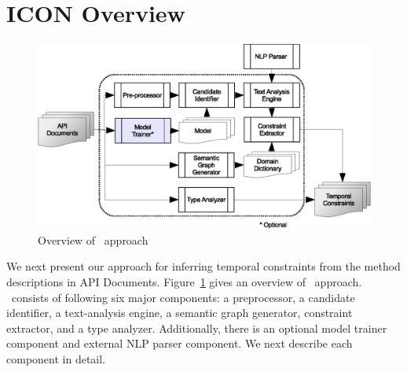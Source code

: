 \section{ICON Overview}
\label{sec:approach}

\begin{figure}
	\centering
		\includegraphics[scale=0.45]{approach.eps}
	\caption{Overview of \tool\ approach}
	\label{fig:approachOverview}
\end{figure}

We next present our approach for inferring temporal constraints
from the method descriptions in API Documents.
Figure~\ref{fig:approachOverview} gives an overview of \tool\ approach.
\tool\ consists of following six major components: a preprocessor, a candidate identifier, a text-analysis engine, a semantic graph generator, constraint extractor, and a type analyzer.
Additionally, there is an optional model trainer component and external NLP parser component.
We next describe each component in detail.



